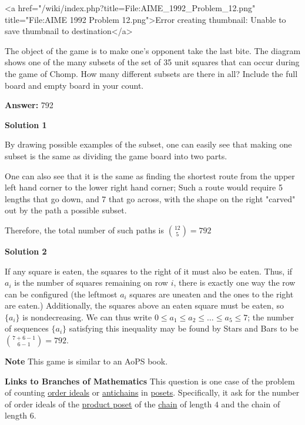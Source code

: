 \begin{enumerate}
 <a href="/wiki/index.php?title=File:AIME\_1992\_Problem\_12.png" title="File:AIME 1992 Problem 12.png">Error creating thumbnail: Unable to save thumbnail to destination</a>


 The object of the game is to make one's opponent take the last bite. The diagram shows one of the many subsets of the set of 35 unit squares that can occur during the game of Chomp. How many different subsets are there in all? Include the full board and empty board in your count.


 
 \textbf{Answer: }792



\textbf{Solution 1}

By drawing possible examples of the subset, one can easily see that making one subset is the same as dividing the game board into two parts.

 One can also see that it is the same as finding the shortest route from the upper left hand corner to the lower right hand corner; Such a route would require 5 lengths that go down, and 7 that go across, with the shape on the right "carved" out by the path a possible subset.

 Therefore, the total number of such paths is $\binom{12}{5}=\boxed{792}$




\textbf{Solution 2}

If any square is eaten, the squares to the right of it must also be eaten. Thus, if $a_i$ is the number of squares remaining on row $i$, there is exactly one way the row can be configured (the leftmost $a_i$ squares are uneaten and the ones to the right are eaten.) Additionally, the squares above an eaten square must be eaten, so $\{a_i\}$ is nondecreasing. We can thus write $0 \leq a_1 \leq a_2 \leq \dots \leq a_5 \leq 7$; the number of sequences $\{a_i\}$ satisfying this inequality may be found by Stars and Bars to be $\binom{7+6-1}{6-1} = \boxed{792}$.

 \textbf{Note} This game is similar to an AoPS book.

 \textbf{Links to Branches of Mathematics} This question is one case of the problem of counting \href{https://artofproblemsolving.com/wiki/index.php?title=Order\_ideal&action=edit&redlink=1}{order ideals} or \href{https://artofproblemsolving.com/wiki/index.php?title=Antichain&action=edit&redlink=1}{antichains} in \href{https://artofproblemsolving.com/wiki/index.php?title=Poset}{posets}.  Specifically, it ask for the number of order ideals of the \href{https://artofproblemsolving.com/wiki/index.php?title=Product\_poset&action=edit&redlink=1}{product poset} of the \href{https://artofproblemsolving.com/wiki/index.php?title=Chain}{chain} of length $4$ and the chain of length $6$.


\end{enumerate}
